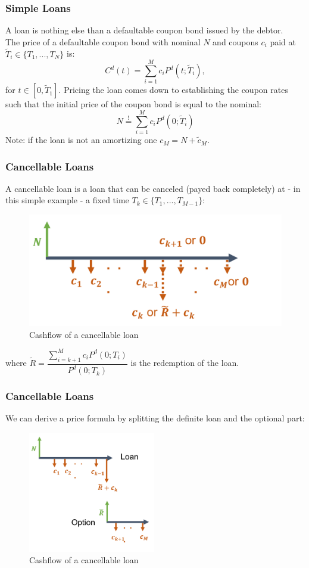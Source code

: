 \documentclass{beamer}
\newcommand{\mbeq}{\overset{!}{=}}
\begin{document}
	\begin{frame}
		\frametitle{Simple Loans}
		A loan is nothing else than a defaultable coupon bond issued by the debtor.\\
		The price of a defaultable coupon bond with nominal \(N\) and coupons \(c_i\) paid at $\tilde{T}_i \in \{T_1, ..., T_N\}$ is:
		\[C^d(t) = \sum_{i=1}^{M}c_iP^d(t;\tilde{T}_i),\]
		for $t\in [0, \tilde{T}_1]$. Pricing the loan comes down to establishing the coupon rates such that the initial price of the coupon bond is equal to the nominal:
		\[N \mbeq \sum_{i=1}^{M}c_i P^d(0;\tilde{T}_i)\]
		Note: if the loan is not an amortizing one $c_M = N + \tilde{c}_M$.
	\end{frame}
	
	\begin{frame}
		\frametitle{Cancellable Loans}
		A cancellable loan is a loan that can be canceled (payed back completely) at - in this simple example - a fixed time \(T_k \in \{T_1, ..., T_{M-1}\}\):
		\begin{figure}
			\centering
			\includegraphics[width=0.5\linewidth]{CancellableLoan}
			\caption[Cashflow of a cancellable loan]{Cashflow of a cancellable loan}
			\label{fig:cancellableLoan}
		\end{figure}
		where \(\tilde{R} = \dfrac{\sum_{i=k+1}^{M}c_i P^d(0;T_i)}{P^d(0;T_k)}\) is the redemption of the loan.
		
	\end{frame}
	
	\begin{frame}
		\frametitle{Cancellable Loans}
	We can derive a price formula by splitting the definite loan and the optional part:
		\begin{figure}
			\centering
			\includegraphics[height=150pt]{LoanAndOption}
			\caption[Splitted Cashflow of a cancellable loan]{Cashflow of a cancellable loan}
			\label{fig:loanAndOption}
		\end{figure}
		
		
	\end{frame}
	
\end{document}
